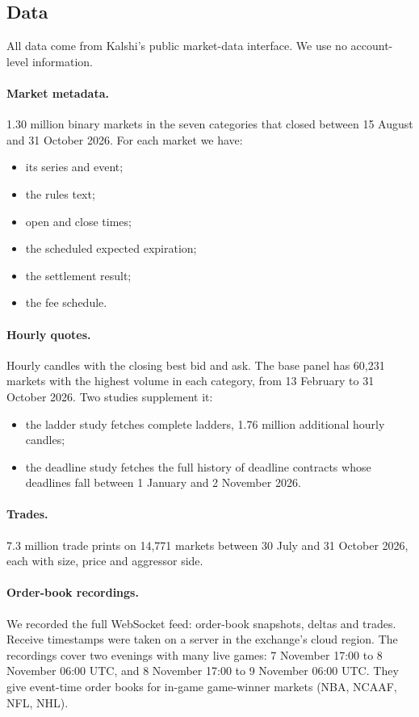 \subsection{Data}

All data come from Kalshi's public market-data interface. We use no account-level information.

\paragraph{Market metadata.} 1.30 million binary markets in the seven categories that closed between
15 August and 31 October 2026. For each market we have:
\begin{itemize}
  \item its series and event;
  \item the rules text;
  \item open and close times;
  \item the scheduled expected expiration;
  \item the settlement result;
  \item the fee schedule.
\end{itemize}

\paragraph{Hourly quotes.} Hourly candles with the closing best bid and ask. The base panel has
60,231 markets with the highest volume in each category, from 13 February to 31 October 2026. Two
studies supplement it:
\begin{itemize}
  \item the ladder study fetches complete ladders, 1.76 million additional hourly candles;
  \item the deadline study fetches the full history of deadline contracts whose deadlines fall
  between 1 January and 2 November 2026.
\end{itemize}

\paragraph{Trades.} 7.3 million trade prints on 14,771 markets between 30 July and 31 October 2026,
each with size, price and aggressor side.

\paragraph{Order-book recordings.} We recorded the full WebSocket feed: order-book snapshots, deltas
and trades. Receive timestamps were taken on a server in the exchange's cloud region. The
recordings cover two evenings with many live games: 7 November 17:00 to 8 November 06:00 UTC, and
8 November 17:00 to 9 November 06:00 UTC. They give event-time order books for in-game
game-winner markets (NBA, NCAAF, NFL, NHL).

